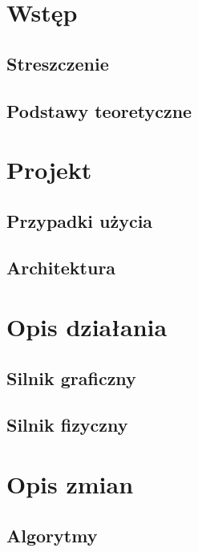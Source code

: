 


	
	\newpage
	
	\newpage

	\tableofcontents
	\newpage

	\chapter{Wstęp}\label{chap:wstęp}
	\section{Streszczenie}\label{sec:streszczenie}
	
	\newpage
	\section{Podstawy teoretyczne}\label{sec:podstawy teoretyczne}
	

	\chapter{Projekt}\label{chap:projekt}
	\section{Przypadki użycia}\label{sec:przypadki użycia}
	
	\section{Architektura}\label{sec:architektura}
	

	\chapter{Opis działania}\label{chap:opis dzialania}
	\section{Silnik graficzny}\label{sec:silnik graficzny}
	
	\section{Silnik fizyczny}\label{sec:silnik fizyczny}
	

	\chapter{Opis zmian}\label{chap:opis zmian}
	\section{Algorytmy}\label{sec:algorytmy}
	
